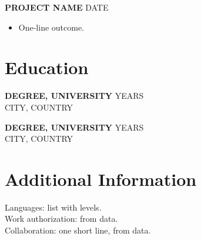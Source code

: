 \documentclass[10pt,a4paper]{article}
\begin{document}
\textbf{PROJECT NAME} \hfill DATE
\begin{itemize}
  \item One-line outcome.
\end{itemize}

\section*{Education}
\textbf{DEGREE, UNIVERSITY} \hfill YEARS\\
CITY, COUNTRY

\textbf{DEGREE, UNIVERSITY} \hfill YEARS\\
CITY, COUNTRY

\section*{Additional Information}
Languages: list with levels.\\
Work authorization: from data.\\
Collaboration: one short line, from data.
\end{document}
